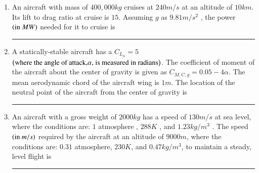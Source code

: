 \documentclass[journal]{IEEEtran}
\begin{document}
\begin{enumerate}
\item An aircraft with mass of $400,000 kg$ cruises at $240 m/s$ at an altitude of $10 km$. Its lift to drag ratio at cruise is $15$. Assuming $g$ as $9.81 m/s^2$ , the power $\left(\text{in } MW\right)$ needed for it to cruise is\rule{2cm}{0.2pt} 
\item A statically-stable aircraft has a $C_{L_{\alpha}}=5$ $\left(\text{where the angle of attack,} \alpha \text{, is measured in radians}\right)$. The coefficient of moment of the aircraft about the center of gravity is given as $C_{M,C,g}=0.05-4\alpha$. The mean aerodynamic chord of the aircraft wing is $1 m$. The location  of the neutral point of the aircraft from the center of gravity is \rule{2cm}{0.2pt} 

\item An aircraft with a gross weight of $2000kg$ has a speed of $130m/s$ at sea level, where the conditions are: $1$ atmosphere , $288K$ , and $1.23 kg/m^3$ . The speed $\left(\text{in } m/s\right)$ required by the aircraft at an altitude of $9000m$, where the conditions are: $0.31$ atmosphere, $230K$, and $0.47 kg/m^3$, to maintain a steady, level flight is \rule{2cm}{0.2pt}  
	\end{enumerate}
\end{document}
